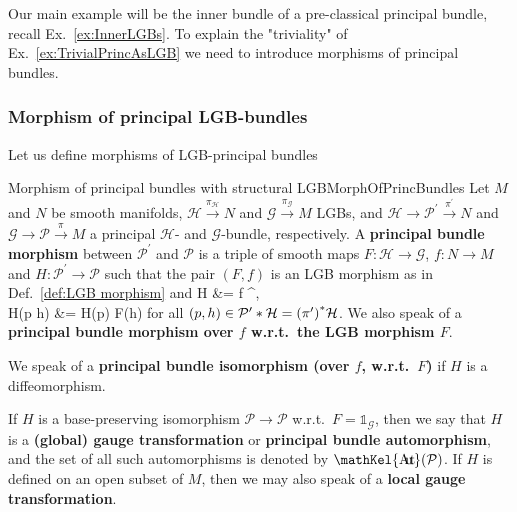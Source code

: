\documentclass[a4paper,oneside,11pt,bibliography=totoc]{scrartcl}
\DeclareMathOperator{\sAut}{\mathKel{A\mkern-5.5mu u\mkern-4mu t\mkern-1.5mu}}
\def\ba#1\ea{\begin{align}#1\end{align}}
\theoremstyle{plain}
\theoremstyle{remark}
\theoremstyle{definition}
\begin{document}
Our main example will be the inner bundle of a pre-classical principal bundle, recall Ex.\ \ref{ex:InnerLGBs}. To explain the "triviality" of Ex.\ \ref{ex:TrivialPrincAsLGB} we need to introduce morphisms of principal bundles.

\subsubsection{Morphism of principal LGB-bundles}

Let us define morphisms of LGB-principal bundles

\begin{definitions}{Morphism of principal bundles with structural LGB}{MorphOfPrincBundles}
Let $M$ and $N$ be smooth manifolds, $\mathcal{H} \stackrel{\pi_{\mathcal{H}}}{\to} N$ and $\mathcal{G} \stackrel{\pi_{\mathcal{G}}}{\to} M$ LGBs, and $\mathcal{H} \to \mathcal{P}^\prime \stackrel{\pi^\prime}{\to} N$ and $\mathcal{G} \to \mathcal{P} \stackrel{\pi}{\to} M$ a principal $\mathcal{H}$- and $\mathcal{G}$-bundle, respectively. A \textbf{principal bundle morphism} between $\mathcal{P}^\prime$ and $\mathcal{P}$ is a triple of smooth maps $F: \mathcal{H} \to \mathcal{G}$, $f: N \to M$ and $H: \mathcal{P}^\prime \to \mathcal{P}$ such that the pair $(F, f)$ is an LGB morphism as in Def.\ \ref{def:LGB morphism} and
\ba
\pi \circ H &= f \circ \pi^\prime,\label{PrincMorphoverBaseMap}\\
H(p \cdot h) &= H(p) \cdot F(h)\label{PrincMorphLGBEquiv}
\ea
for all $(p, h) \in \mathcal{P}^\prime * \mathcal{H} = \mleft(\pi^\prime\mright)^*\mathcal{H}$. We also speak of a \textbf{principal bundle morphism over $f$ w.r.t.\ the LGB morphism $F$}.

We speak of a \textbf{principal bundle isomorphism (over $f$, w.r.t.\ $F$)} if $H$ is a diffeomorphism. 

If $H$ is a base-preserving isomorphism $\mathcal{P} \to \mathcal{P}$ w.r.t.\ $F = \mathds{1}_{\mathcal{G}}$, then we say that $H$ is a \textbf{(global) gauge transformation} or \textbf{principal bundle automorphism}, and the set of all such automorphisms is denoted by $\sAut(\mathcal{P})$. If $H$ is defined on an open subset of $M$, then we may also speak of a \textbf{local gauge transformation}.
\end{definitions}
\end{document}
